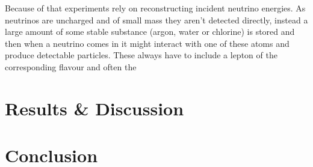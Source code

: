 \documentclass[a4paper,12pt]{article}
\begin{document}
Because of that experiments rely on reconstructing incident neutrino energies.
As neutrinos are uncharged and of small mass they aren't detected directly, instead a large amount of some stable substance (argon, water or chlorine) is stored and then when a neutrino comes in it might interact with one of these atoms and produce detectable particles.
These always have to include a lepton of the corresponding flavour and often the









\newpage


\section{Results \& Discussion}

\section{Conclusion}

\printbibliography
\end{document}
